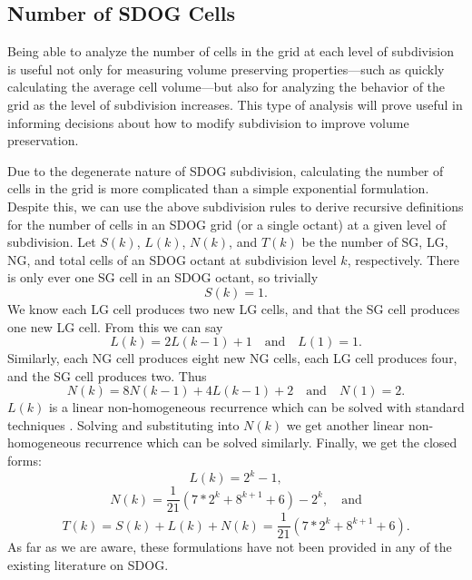 \subsection{Number of SDOG Cells} \label{sec:sdog-numCells}
Being able to analyze the number of cells in the grid at each level of subdivision is useful not only for measuring volume preserving properties---such as quickly calculating the average cell volume---but also for analyzing the behavior of the grid as the level of subdivision increases.
This type of analysis will prove useful in informing decisions about how to modify subdivision to improve volume preservation.


Due to the degenerate nature of SDOG subdivision, calculating the number of cells in the grid is more complicated than a simple exponential formulation.
Despite this, we can use the above subdivision rules to derive recursive definitions for the number of cells in an SDOG grid (or a single octant) at a given level of subdivision.
Let $S(k)$, $L(k)$, $N(k)$, and $T(k)$ be the number of SG, LG, NG, and total cells of an SDOG octant at subdivision level $k$, respectively.
There is only ever one SG cell in an SDOG octant, so trivially
%
\begin{equation}
S(k) = 1.
\label{eq:sg-num}
\end{equation}
%
We know each LG cell produces two new LG cells, and that the SG cell produces one new LG cell.
From this we can say
\begin{equation*}
L(k) = 2L(k-1) + 1 \quad\text{and}\quad L(1) = 1.
\label{eq:lg-recursive}
\end{equation*}
%
Similarly, each NG cell produces eight new NG cells, each LG cell produces four, and the SG cell produces two.
Thus
\begin{equation*}
N(k) = 8N(k-1) + 4L(k-1) + 2 \quad\text{and}\quad N(1) = 2.
\label{eq:ng-recursive}
\end{equation*}
%
$L(k)$ is a linear non-homogeneous recurrence which can be solved with standard techniques \cite{bellman1963differential}.
Solving and substituting into $N(k)$ we get another linear non-homogeneous recurrence which can be solved similarly.
Finally, we get the closed forms:
%
\begin{equation}
L(k) = 2^{k} - 1,
\label{eq:lg-closed}
\end{equation}
%
\begin{equation}
N(k) = \frac{1}{21} \left( 7*2^{k} + 8^{k+1} + 6 \right) - 2^{k}, \quad\text{and}
\label{eq:ng-closed}
\end{equation}
%
\begin{equation}
T(k) = S(k) + L(k) + N(k) = \frac{1}{21} \left( 7*2^{k} + 8^{k+1} + 6 \right).
\label{eq:t-closed}
\end{equation}
%
As far as we are aware, these formulations have not been provided in any of the existing literature on SDOG.


